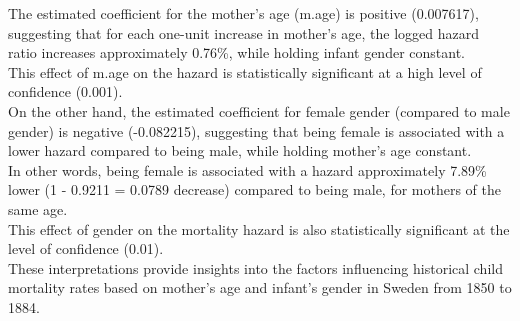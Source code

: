 \documentclass[oneside]{article}
\begin{document}
The estimated coefficient for the mother's age (m.age) is positive (0.007617), suggesting that for each one-unit increase in mother's age, the logged hazard ratio increases approximately 0.76\%, while holding infant gender constant.
\\
This effect of m.age on the hazard is statistically significant at a high level of confidence (0.001).
\\
On the other hand, the estimated coefficient for female gender (compared to male gender) is negative (-0.082215), suggesting that being female is associated with a lower hazard compared to being male, while holding mother's age constant.
\\
In other words, being female is associated with a hazard approximately 7.89\% lower (1 - 0.9211 = 0.0789 decrease) compared to being male, for mothers of the same age.
\\
This effect of gender on the mortality hazard is also statistically significant at the level of confidence (0.01).
\\
These interpretations provide insights into the factors influencing historical child mortality rates based on mother's age and infant's gender in Sweden from 1850 to 1884. 
\end{document}
